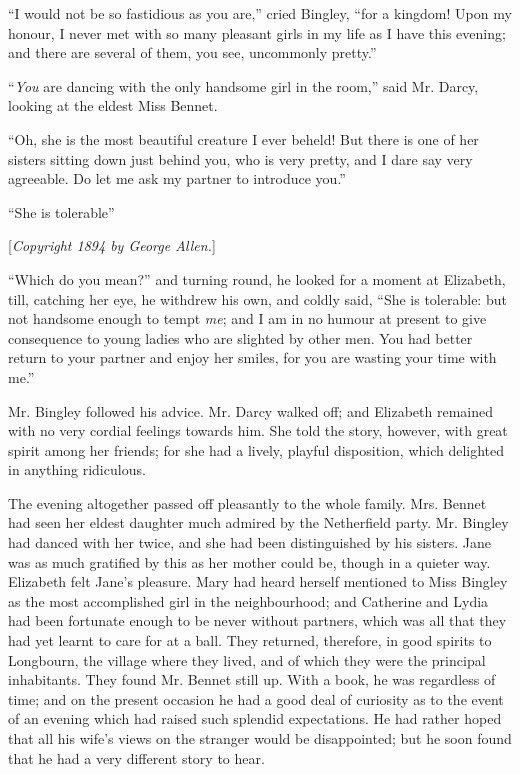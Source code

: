 \documentclass[12pt,openright]{book}
\begin{document}
“I would not be so fastidious as you are,” cried Bingley, “for a kingdom! Upon my honour, I never met with so many pleasant girls in my life as I have this evening; and there are several of them, you see, uncommonly pretty.”

“\textit{You} are dancing with the only handsome girl in the room,” said Mr. Darcy, looking at the eldest Miss Bennet.

“Oh, she is the most beautiful creature I ever beheld! But there is one of her sisters sitting down just behind you, who is very pretty, and I dare say very agreeable. Do let me ask my partner to introduce you.”

“She is tolerable”


[\textit{Copyright 1894 by George Allen.}]

“Which do you mean?” and turning round, he looked for a moment at Elizabeth, till, catching her eye, he withdrew his own, and coldly said, “She is tolerable: but not handsome enough to tempt \textit{me}; and I am in no humour at present to give consequence to young ladies who are slighted by other men. You had better return to your partner and enjoy her smiles, for you are wasting your time with me.”

Mr. Bingley followed his advice. Mr. Darcy walked off; and Elizabeth remained with no very cordial feelings towards him. She told the story, however, with great spirit among her friends; for she had a lively, playful disposition, which delighted in anything ridiculous.

The evening altogether passed off pleasantly to the whole family. Mrs. Bennet had seen her eldest daughter much admired by the Netherfield party. Mr. Bingley had danced with her twice, and she had been distinguished by his sisters. Jane was as much gratified by this as her mother could be, though in a quieter way. Elizabeth felt Jane’s pleasure. Mary had heard herself mentioned to Miss Bingley as the most accomplished girl in the neighbourhood; and Catherine and Lydia had been fortunate enough to be never without partners, which was all that they had yet learnt to care for at a ball. They returned, therefore, in good spirits to Longbourn, the village where they lived, and of which they were the principal inhabitants. They found Mr. Bennet still up. With a book, he was regardless of time; and on the present occasion he had a good deal of curiosity as to the event of an evening which had raised such splendid expectations. He had rather hoped that all his wife’s views on the stranger would be disappointed; but he soon found that he had a very different story to hear.
\end{document}
